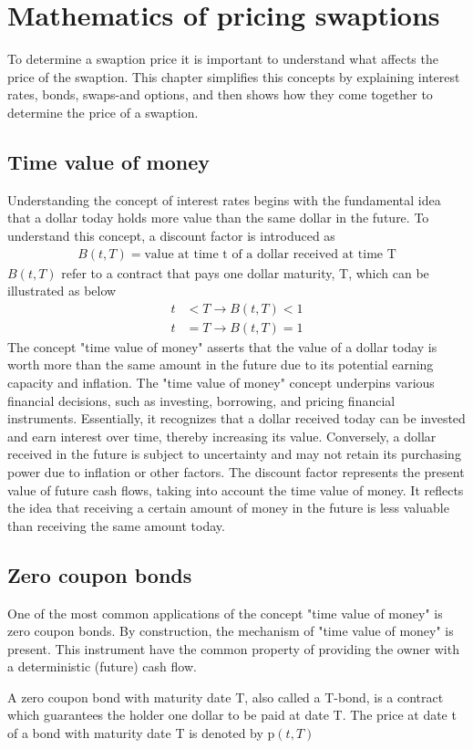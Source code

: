 \section{Mathematics of pricing swaptions}
To determine a swaption price it is important to understand what affects the price of the swaption. 
This chapter simplifies this concepts by explaining interest rates, bonds, swaps-and options, 
and then shows how they come together to determine the price of a swaption.
\subsection{Time value of money}
Understanding the concept of interest rates begins with the fundamental idea that a dollar today holds 
more value than the same dollar in the future. To understand this concept, a discount factor is introduced as 
\begin{align*}
    B(t,T) = \text{value at time t of a dollar received at time T}
\end{align*} 
$B(t,T)$ refer to a contract that pays one dollar maturity, T, which can be illustrated as below
\begin{align*}
    t & < T \rightarrow B(t,T) < 1 \\
    t & = T \rightarrow B(t,T) = 1
\end{align*}
The concept "time value of money" asserts that the value of a dollar today is worth more than
the same amount in the future due to its potential earning capacity and inflation.
The "time value of money" concept underpins various financial decisions, such as investing, borrowing,
and pricing financial instruments. Essentially, it recognizes that a dollar received today can be invested 
and earn interest over time, thereby increasing its value. Conversely, a dollar received in the future
is subject to uncertainty and may not retain its purchasing power due to inflation or other factors.
The discount factor represents the present value of future cash flows, taking into account the time value of money.
It reflects the idea that receiving a certain amount of money in the future is less valuable than receiving 
the same amount today.
\subsection{Zero coupon bonds}
One of the most common applications of the concept "time value of money" is zero coupon bonds. 
By construction, the mechanism of "time value of money" is present. This instrument 
have the common property of providing the owner with a deterministic (future) cash flow. 
\begin{definition}\label{def:zcb}
    A zero coupon bond with maturity date T, also called a T-bond, is a contract which 
    guarantees the holder one dollar to be paid at date T. The price at date t of 
    a bond with maturity date T is denoted by p$(t,T)$ \cite{Bjork} 
\end{definition} 
